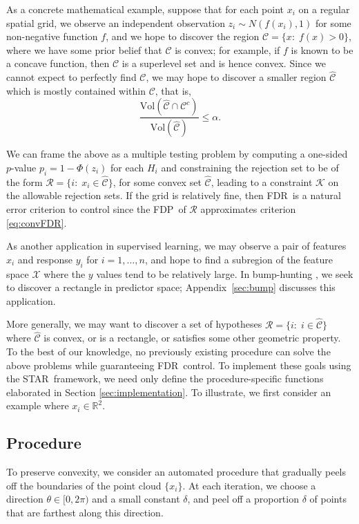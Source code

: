 \documentclass{biometrika}
\newcommand{\cX}{\mathcal{X}}
\newcommand{\cC}{\mathcal{C}}
\newcommand{\cR}{\mathcal{R}}
\newcommand{\cK}{\mathcal{K}}
\newcommand{\textFDP}{FDP}
\newcommand{\textFDR}{FDR}
\renewcommand{\star}{STAR}
\newcommand{\R}{\mathbb{R}}
\newcommand{\1}{\mathbf{1}}
\begin{document}
As a concrete mathematical example, suppose that for each point $x_i$ on a regular spatial grid, we observe an independent observation $z_i \sim N(f(x_i), 1)$ for some non-negative function $f$, and we hope to discover the region $\cC = \{x:\; f(x) > 0\}$, where we have some prior belief that $\cC$ is convex; for example, if $f$ is known to be a concave function, then $\cC$ is a superlevel set and is hence convex. Since we cannot expect to perfectly find $\cC$, we may hope to discover a smaller region $\widehat{\cC}$ which is mostly contained within $\cC$, that is, 
\begin{equation}\label{eq:convFDR}
\frac{\text{Vol}(\widehat{\cC} \cap \cC^c)}{\text{Vol}(\widehat{\cC})} \leq \alpha.
\end{equation}

We can frame the above as a multiple testing problem by computing a one-sided $p$-value $p_i = 1-\Phi(z_i)$ for each $H_i$ and constraining the rejection set to be of the form $\cR = \{i:\; x_i \in \widehat{\cC}\}$, for some convex set $\widehat{\cC}$, leading to a constraint $\cK$ on the allowable rejection sets. If the grid is relatively fine, then \textFDR ~is a natural error criterion to control since the \textFDP ~of $\cR$ approximates criterion \eqref{eq:convFDR}.

As another application in supervised learning, we may observe a pair of features $x_i$ and response $y_i$ for $i=1,\ldots,n$, and hope to find a subregion of the feature space $\cX$ where the $y$ values tend to be relatively large. In bump-hunting \citep{friedman99}, we seek to discover a rectangle in predictor space; Appendix~\ref{sec:bump} discusses this application.



More generally, we may want to discover a set of hypotheses $\cR = \{i:\; i\in \widehat{\cC}\}$ where $\widehat{\cC}$ is convex, or is a rectangle, or satisfies some other geometric property. To the best of our knowledge, no previously existing procedure can solve the above problems while guaranteeing \textFDR ~control. To implement these goals using the \star ~framework, we need only define the procedure-specific functions elaborated in Section \ref{sec:implementation}. To illustrate, we first consider an example where $x_{i}\in \R^{2}$. 

\subsection{Procedure}\label{subsubsec:convex_proc}
To preserve convexity, we consider an automated procedure that gradually peels off the boundaries of the point cloud $\{x_{i}\}$. At each iteration, we choose a direction $\theta\in [0, 2\pi)$ and a small constant $\delta$, and peel off a proportion $\delta$ of points that are farthest along this direction.
\end{document}
